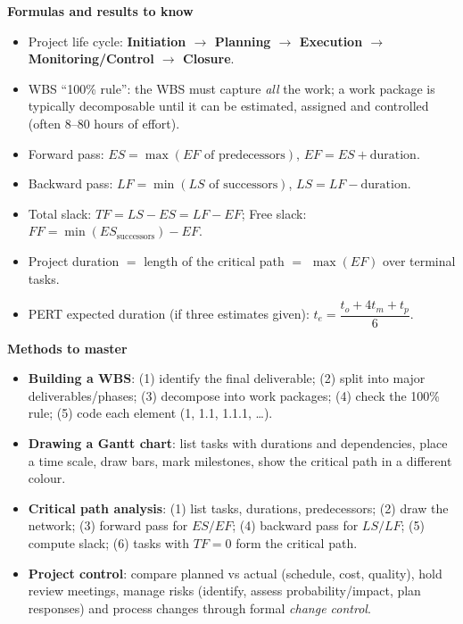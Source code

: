 \documentclass[11pt]{article}
\begin{document}
\begin{bilan}
\textbf{Formulas and results to know}
\begin{itemize}
\item Project life cycle: \textbf{Initiation $\rightarrow$ Planning $\rightarrow$ Execution $\rightarrow$ Monitoring/Control $\rightarrow$ Closure}.
\item WBS ``100\% rule'': the WBS must capture \emph{all} the work; a work package is typically decomposable until it can be estimated, assigned and controlled (often 8--80 hours of effort).
\item Forward pass: $ES = \max(EF \text{ of predecessors})$, \quad $EF = ES + \text{duration}$.
\item Backward pass: $LF = \min(LS \text{ of successors})$, \quad $LS = LF - \text{duration}$.
\item Total slack: $TF = LS - ES = LF - EF$; \quad Free slack: $FF = \min(ES_{\text{successors}}) - EF$.
\item Project duration $=$ length of the critical path $=$ $\max(EF)$ over terminal tasks.
\item PERT expected duration (if three estimates given): $t_e = \dfrac{t_o + 4t_m + t_p}{6}$.
\end{itemize}

\textbf{Methods to master}
\begin{itemize}
\item \textbf{Building a WBS}: (1) identify the final deliverable; (2) split into major deliverables/phases; (3) decompose into work packages; (4) check the 100\% rule; (5) code each element (1, 1.1, 1.1.1, \ldots).
\item \textbf{Drawing a Gantt chart}: list tasks with durations and dependencies, place a time scale, draw bars, mark milestones, show the critical path in a different colour.
\item \textbf{Critical path analysis}: (1) list tasks, durations, predecessors; (2) draw the network; (3) forward pass for $ES/EF$; (4) backward pass for $LS/LF$; (5) compute slack; (6) tasks with $TF=0$ form the critical path.
\item \textbf{Project control}: compare planned vs actual (schedule, cost, quality), hold review meetings, manage risks (identify, assess probability/impact, plan responses) and process changes through formal \emph{change control}.
\end{itemize}


\end{bilan}
\end{document}
